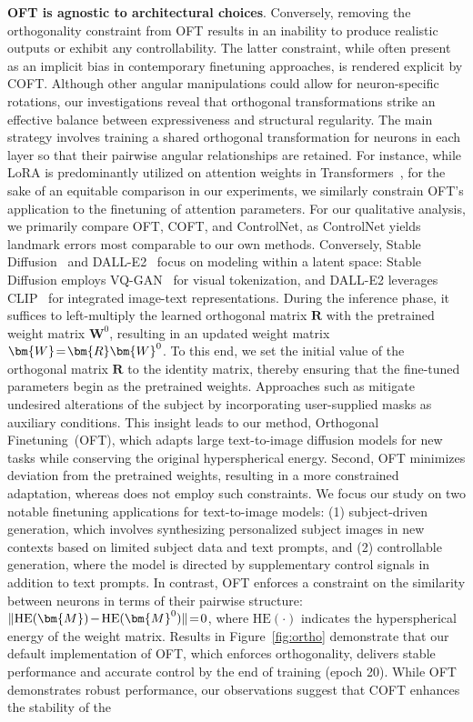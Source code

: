 \begin{itemize}[leftmargin=*,nosep]
\textbf{OFT is agnostic to architectural choices}. Conversely, removing the orthogonality constraint from OFT results in an inability to produce realistic outputs or exhibit any controllability. The latter constraint, while often present as an implicit bias in contemporary finetuning approaches, is rendered explicit by COFT. Although other angular manipulations could allow for neuron-specific rotations, our investigations reveal that orthogonal transformations strike an effective balance between expressiveness and structural regularity. The main strategy involves training a shared orthogonal transformation for neurons in each layer so that their pairwise angular relationships are retained. For instance, while LoRA is predominantly utilized on attention weights in Transformers~\cite{hulora2022}, for the sake of an equitable comparison in our experiments, we similarly constrain OFT’s application to the finetuning of attention parameters. For our qualitative analysis, we primarily compare OFT, COFT, and ControlNet, as ControlNet yields landmark errors most comparable to our own methods. Conversely, Stable Diffusion~\cite{rombach2022high} and DALL-E2~\cite{ramesh2022hierarchical} focus on modeling within a latent space: Stable Diffusion employs VQ-GAN~\cite{esser2021taming} for visual tokenization, and DALL-E2 leverages CLIP~\cite{radford2021learning} for integrated image-text representations. During the inference phase, it suffices to left-multiply the learned orthogonal matrix $\bm{R}$ with the pretrained weight matrix $\bm{W}^0$, resulting in an updated weight matrix $\thickmuskip=2mu \medmuskip=2mu \bm{W} = \bm{R} \bm{W}^0$. To this end, we set the initial value of the orthogonal matrix $\bm{R}$ to the identity matrix, thereby ensuring that the fine-tuned parameters begin as the pretrained weights. Approaches such as \cite{avrahami2022blended,nichol2022glide} mitigate undesired alterations of the subject by incorporating user-supplied masks as auxiliary conditions. This insight leads to our method, Orthogonal Finetuning~(OFT), which adapts large text-to-image diffusion models for new tasks while conserving the original hyperspherical energy. Second, OFT minimizes deviation from the pretrained weights, resulting in a more constrained adaptation, whereas \cite{liu2021orthogonal} does not employ such constraints. We focus our study on two notable finetuning applications for text-to-image models: (1) subject-driven generation, which involves synthesizing personalized subject images in new contexts based on limited subject data and text prompts, and (2) controllable generation, where the model is directed by supplementary control signals in addition to text prompts. In contrast, OFT enforces a constraint on the similarity between neurons in terms of their pairwise structure: $\thickmuskip=2mu \medmuskip=2mu \| \text{HE}(\bm{M})-\text{HE}(\bm{M}^0) \|=0$, where $\text{HE}(\cdot)$ indicates the hyperspherical energy of the weight matrix. Results in Figure~\ref{fig:ortho} demonstrate that our default implementation of OFT, which enforces orthogonality, delivers stable performance and accurate control by the end of training (epoch 20). While OFT demonstrates robust performance, our observations suggest that COFT enhances the stability of the 
\end{itemize}
